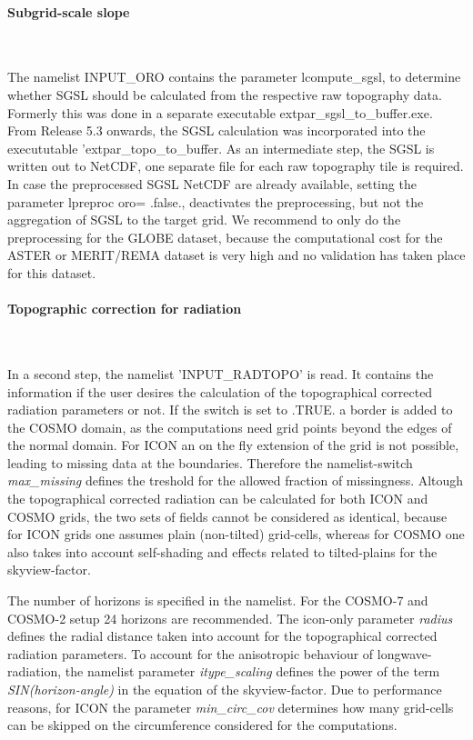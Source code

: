 \documentclass[a4paper,10pt,DIV14,BCOR1cm,titlepage,twoside]{scrartcl}
\begin{document}
\paragraph{Subgrid-scale slope}\ \par\medskip\noindent
The namelist INPUT\_ORO contains the parameter lcompute\_sgsl, to determine whether SGSL should be calculated from the respective raw topography data. Formerly this was done in a separate executable extpar\_sgsl\_to\_buffer.exe. From Release 5.3 onwards, the SGSL calculation was incorporated into the execututable 'extpar\_topo\_to\_buffer. As an intermediate step, the SGSL is written out to NetCDF, one separate file for each raw topography tile is required. In case the preprocessed SGSL NetCDF are already available, setting the parameter lpreproc oro= .false., deactivates the preprocessing, but not the aggregation of SGSL to the target grid. We recommend to only do the preprocessing for the GLOBE dataset, because the computational cost for the ASTER or MERIT/REMA dataset is very high and no validation has taken place for this dataset.
\paragraph{Topographic correction for radiation}\ \par\medskip\noindent
In a second step, the namelist 'INPUT\_RADTOPO' is read. It contains the information if the user desires the calculation of the topographical corrected radiation parameters or not.
If the switch is set to .TRUE. a border is added to the COSMO domain, as the computations need grid points beyond the edges of the normal domain. For ICON an on the fly extension of the grid is not possible, leading to missing data at the boundaries. Therefore the namelist-switch \textit{max\_missing} defines the treshold for the allowed fraction of missingness.
Altough the topographical corrected radiation can be calculated for both ICON and COSMO grids, the two sets of fields cannot be considered as identical, because for ICON grids one assumes plain (non-tilted) grid-cells, whereas for COSMO one also takes into account self-shading and effects related to tilted-plains for the skyview-factor. 

The number of horizons is specified in the namelist. For the COSMO-7 and COSMO-2 setup 24 horizons are recommended. The icon-only parameter \textit{radius} defines the radial distance taken into account for the topographical corrected radiation parameters. 
To account for the anisotropic behaviour of longwave-radiation, the namelist parameter \textit{itype\_scaling} defines the power of the term \textit{SIN(horizon-angle)} in the equation of the skyview-factor.
Due to performance reasons, for ICON the parameter \textit{min\_circ\_cov}  determines how many grid-cells can be skipped on the circumference considered for the computations.\par\medskip\noindent
\end{document}
